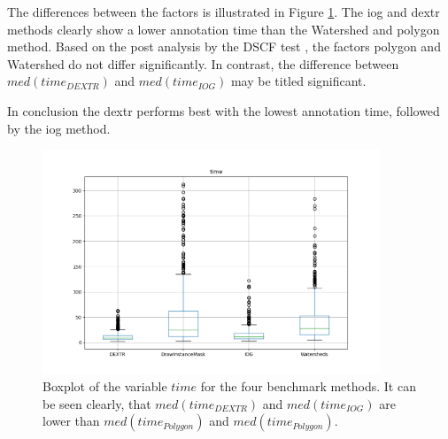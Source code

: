 The differences between the factors is illustrated in Figure \ref{fig:ch5:sec1:time_boxplot}.
The \gls{iog} and \gls{dextr} methods clearly show a lower annotation time than the Watershed and polygon method.
Based on the post analysis by the DSCF test \cite{CF91-dscf}, the factors polygon and Watershed do not differ significantly.
In contrast, the difference between $med \left( time_{DEXTR} \right)$ and $med \left( time_{IOG} \right)$ may be titled significant.

In conclusion the \gls{dextr} performs best with the lowest annotation time, followed by the \gls{iog} method.
\begin{figure}
	\centering
	\includegraphics[width=0.9\textwidth]{figures/chap51_time_boxplot.png}
	\caption[Boxplot IoU per method]{
		Boxplot of the variable $time$ for the four benchmark methods.
		It can be seen clearly, that $med \left( time_{DEXTR} \right)$ and $med \left( time_{IOG} \right)$ are lower than $med \left( time_{Polygon} \right)$ and $med \left( time_{Polygon} \right)$.
	} \label{fig:ch5:sec1:time_boxplot}
\end{figure}









